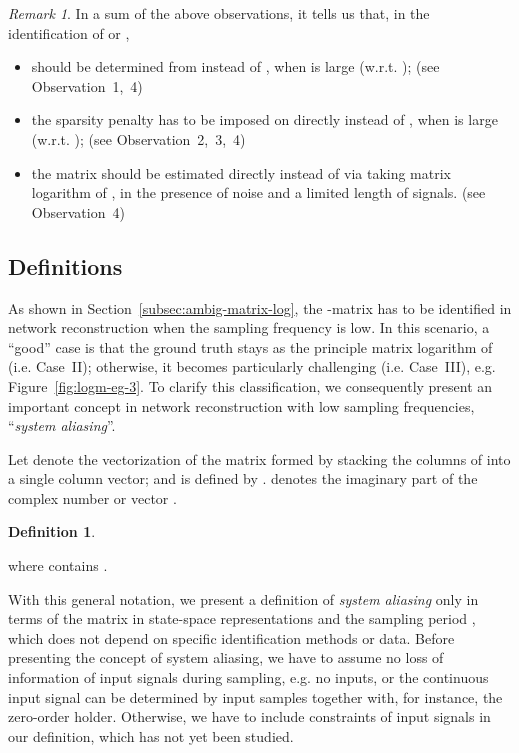 \documentclass[letterpaper,10pt,journal,final]{IEEEtran}
\theoremstyle{definition}
\newtheorem{definition}[theorem]{Definition}
\theoremstyle{remark}
\newtheorem{remark}{Remark}
\begin{document}
\begin{remark}
  In a sum of the above observations, it tells us that, in the identification of  or ,
  \begin{itemize}
  \item   should be determined from  instead of , when  is
    large (w.r.t. ); (see {Observation~1,~4})
  \item  the sparsity penalty has to be imposed on  directly instead of ,
    when  is large (w.r.t. ); (see {Observation~2,~3,~4})
  \item  the  matrix should be estimated directly instead of via taking matrix
    logarithm of , in the presence of noise and a limited length of
    signals. (see {Observation~4})
  \end{itemize}
\end{remark}


\subsection{Definitions}
\label{subsec:definitions}

As shown in Section~\ref{subsec:ambig-matrix-log}, the -matrix has to be
identified in network reconstruction when the sampling frequency is low. In this
scenario, a ``good'' case is that the ground truth  stays as the principle
matrix logarithm of  (i.e. {Case~II}); otherwise, it becomes particularly
challenging (i.e. {Case~III}), e.g. Figure~\ref{fig:logm-eg-3}.  To clarify this
classification, we consequently present an important concept in network
reconstruction with low sampling frequencies, ``\emph{system aliasing}''.

Let  denote the vectorization of the matrix  formed by stacking the
columns of  into a single column vector; and  is defined by
.  denotes the imaginary part of the complex
number or vector .
\begin{definition}
  \label{def:E-for-sys-alias}

  
  where  contains .
\end{definition}

With this general notation, we present a definition of \emph{system aliasing}
only in terms of the  matrix in state-space representations and the sampling
period , which does not depend on specific identification methods or data.
Before presenting the concept of system aliasing, we have to assume no loss of
information of input signals during sampling, e.g. no inputs, or the continuous
input signal can be determined by input samples together with, for instance, the
zero-order holder. Otherwise, we have to include constraints of input signals in
our definition, which has not yet been studied.
\end{document}
